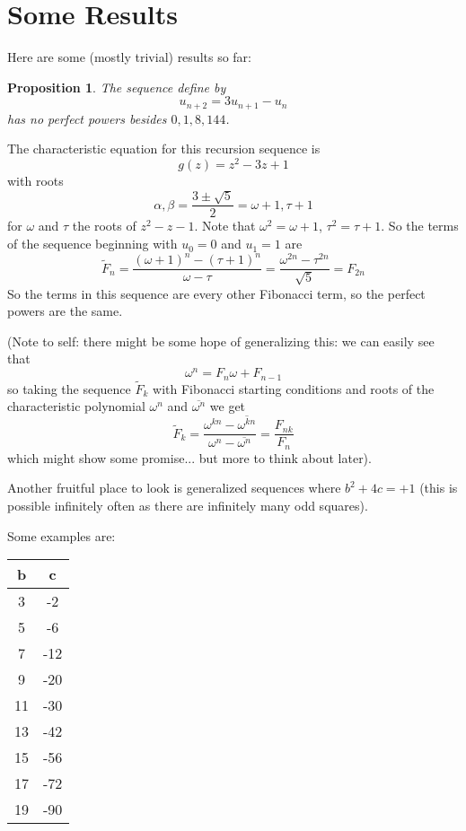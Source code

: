 \documentclass[12pt]{article}
\newtheorem{prop}[thm]{Proposition}
\newenvironment{proof}[1][Proof.]{\begin{trivlist}
\item[\hskip \labelsep {\bfseries #1}]}{\end{trivlist}}
\renewcommand{\bar}{\overline}
\begin{document}
\section{Some Results}

Here are some (mostly trivial) results so far:

\begin{prop}
The sequence define by
\[ u_{n+2} = 3u_{n+1}-u_n \]
has no perfect powers besides $0,1,8,144$.
\end{prop}

\begin{proof}
The characteristic equation for this recursion sequence is
\[g(z) = z^2-3z+1\]
with roots
\[ \alpha, \beta = \frac{3 \pm \sqrt{5}}{2} = \omega+1, \tau+1 \]
for $\omega$ and $\tau$ the roots of $z^2-z-1$.  Note that $\omega^2 = \omega+1$, $\tau^2 = \tau + 1$.  So the terms of the sequence beginning with $u_0 = 0$ and $u_1 = 1$ are
\[ \tilde{F}_n = \frac{(\omega+1)^n - (\tau+1)^n}{\omega-\tau} = \frac{\omega^{2n} - \tau^{2n}}{\sqrt{5}} = F_{2n} \]
So the terms in this sequence are every other Fibonacci term, so the perfect powers are the same.
\end{proof}

(Note to self: there might be some hope of generalizing this: we can easily see that
\[ \omega^n = F_n\omega +F_{n-1} \]
so taking the sequence $\tilde{F}_k$ with Fibonacci starting conditions and roots of the characteristic polynomial $\omega^n$ and $\bar{\omega^n}$ we get 
\[ \tilde{F}_k = \frac{\omega^{kn} - \bar{\omega^{kn}}}{\omega^n-\bar{\omega^n}} = \frac{F_{nk}}{F_n} \]
which might show some promise... but more to think about later).


Another fruitful place to look is generalized sequences where $b^2+4c = +1$ (this is possible infinitely often as there are infinitely many odd squares).

Some examples are:

\begin{center}
\begin{tabular}{ c | c}
b & c \\ \hline \hline
3 & -2 \\
5 & -6 \\
7 & -12 \\
9 & -20 \\
11 & -30 \\
13 & -42 \\
15 & -56 \\
17 & -72 \\
19 & -90 
\end{tabular}
\end{center}
\end{document}
